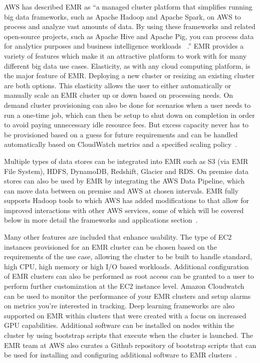 AWS has described EMR as ``a managed cluster platform that simplifies running 
big data frameworks, such as Apache Hadoop and Apache Spark, on AWS to process 
and analyze vast amounts of data. By using these frameworks and related 
open-source projects, such as Apache Hive and Apache Pig, you can process data 
for analytics purposes and business intelligence workloads
~\cite{hid-sp18-521-amazonemr-whatisemr}.'' EMR provides a variety of features
which make it an attractive platform to work with for many different big data
use cases. Elasticity, as with any cloud computing platform, is the major 
feature of EMR. Deploying a new cluster or resizing an existing cluster are 
both options. This elasticity allows the user to either automatically or 
manually scale an EMR cluster up or down based on processing needs. On demand 
cluster provisioning can also be done for scenarios when a user needs to run 
a one-time job, which can then be setup to shut down on completion in order 
to avoid paying unnecessary idle resource fees. But excess capacity never has 
to be provisioned based on a guess for future requirements and can be handled 
automatically based on CloudWatch metrics and a specified scaling 
policy~\cite{hid-sp18-521-amazonemr-details}.  

Multiple types of data stores can be integrated into EMR such as S3 (via EMR
File System), HDFS, DynamoDB, Redshift, Glacier and RDS. On premise data 
stores can also be used by EMR by integrating the AWS Data Pipeline, which 
can move data between on premise and AWS at chosen intervals. EMR fully 
supports Hadoop tools to which AWS has added modifications to that allow 
for improved interactions with other AWS services, some of which will be 
covered below in more detail the frameworks and applications 
section~\cite{hid-sp18-521-amazonemr-details}.  

Many other features are included that enhance usability. The type of EC2 
instances provisioned for an EMR cluster can be chosen based on the 
requirements of the use case, allowing the cluster to be built to handle 
standard, high CPU, high memory or high I/O based workloads. Additional 
configuration of EMR clusters can also be performed as root access can be 
granted to a user to perform further customization at the EC2 instance level. 
Amazon Cloudwatch can be used to monitor the performance of your EMR clusters 
and setup alarms on metrics you're interested in tracking. Deep learning 
frameworks are also supported on EMR within clusters that were created with 
a focus on increased GPU capabilities. Additional software can be installed 
on nodes within the cluster by using bootstrap scripts that execute when the 
cluster is launched. The EMR team at AWS also curates a Github repository of 
bootstrap scripts that can be used for installing and configuring additional 
software to EMR clusters~\cite{hid-sp18-521-amazonemr-details}. 

